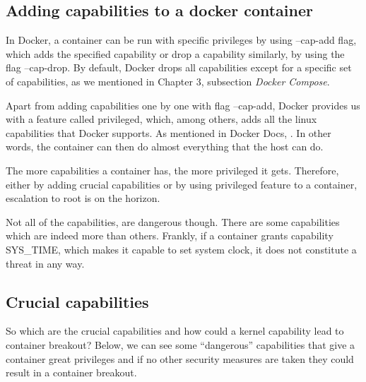 \subsection{Adding capabilities to a docker container}
In Docker, a container can be run with specific privileges by using --cap-add flag, which adds the specified capability or drop a capability similarly, by using the flag --cap-drop. By default, Docker drops all capabilities except for a specific set of capabilities, as we mentioned in Chapter 3, subsection \textit{Docker Compose}.
 
Apart from adding capabilities one by one with flag --cap-add, Docker provides us with a feature called privileged, which, among others, adds all the linux capabilities that Docker supports. 
As mentioned in Docker Docs, . In other words, the container can then do almost everything that the host can do.

The more capabilities a container has, the more privileged it gets. 
Therefore, either by adding crucial capabilities or by using privileged feature to a container, escalation to root is on the horizon.

Not all of the capabilities, are dangerous though. There are some capabilities which are indeed more  than others. Frankly, if a container grants capability SYS\_TIME, which makes it capable to set system clock, it does not constitute a threat in any way.

\subsection{Crucial capabilities}
So which are the crucial capabilities and how could a kernel capability lead to container breakout?
Below, we can see some “dangerous” capabilities that give a container great privileges and if no other security measures are taken they could result in a container breakout.


